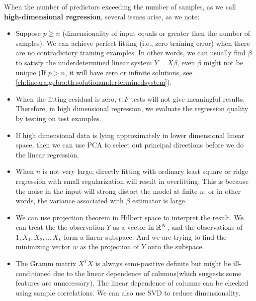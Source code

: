 \begin{refsection}
When the number of predictors exceeding the number of samples, as we call \textbf{high-dimensional regression}, several issues arise, as we note:
\begin{remark}\cite[241]{james2013introduction}
	\begin{itemize}
		\item 	Suppose $p \geq n$ (dimensionality of input equals or greater then the number of samples). We can achieve perfect fitting (i.e., zero training error) when there are no contradictory training examples. In other words, we can usually find $\beta$ to satisfy the underdetermined linear system $Y=X\beta$, even $\beta$ might not be unique (If $p>n$, it will have zero or infinite solutions, see \autoref{ch:linearalgebra:th:solutionunderterminedsystem}).
		\item When the fitting residual is zero,  $t,F$ tests will not give meaningful results. Therefore, in high dimensional regression, we evaluate the regression quality by testing on test examples.
	\end{itemize}
\end{remark}


\begin{remark}\hfill
	\begin{itemize}
		\item If high dimensional data is lying approximately in lower dimensional linear space, then we can use PCA to select out principal directions before we do the linear regression.
		\item When $n$ is not very large, directly fitting with ordinary least square or ridge regression with small regularization will result in overfitting. This is because the noise in the input will strong distort the model at finite $n$; or in other words, the variance associated with $\beta$ estimator is large.
	\end{itemize}
\end{remark}



\begin{remark}[interpretation]\hfill
\begin{itemize}
    \item We can use projection theorem in Hilbert space to interpret the result. We can treat the the observation $Y$ as a vector in $\mathbb{R}^N$, and the observations of $1,X_1,X_2,..,X_k$ form a linear subspace. And we are trying to find the minimizing vector $w$ as the projection of $Y$ onto the subspace. 
    \item The Gramm matrix $X^TX$ is always semi-positive definite but might be ill-conditioned due to the linear dependence of columns(which suggests some features are unnecessary). The linear dependence of columns can be checked using sample correlations. We can also use SVD to reduce dimensionality.
\end{itemize}
\end{remark}



\end{refsection}
